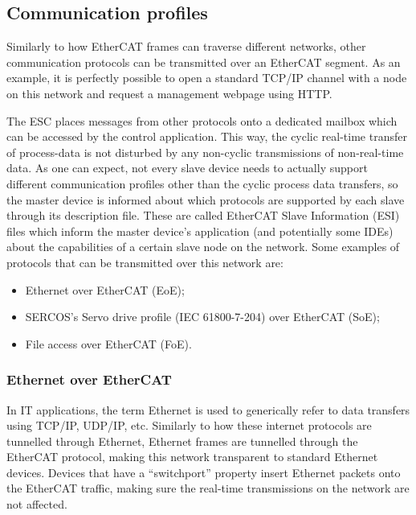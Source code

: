 \subsection{Communication profiles} \label{subsec:comm_profiles}

Similarly to how EtherCAT frames can traverse different networks, other communication protocols can be transmitted over an EtherCAT segment.
As an example, it is perfectly possible to open a standard TCP/IP channel with a node on this network and request a management webpage using HTTP.

The ESC places messages from other protocols onto a dedicated mailbox which can be accessed by the control application.
This way, the cyclic real-time transfer of process-data is not disturbed by any non-cyclic transmissions of non-real-time data.
As one can expect, not every slave device needs to actually support different communication profiles other than the cyclic process data transfers, so the master device is informed about which protocols are supported by each slave through its description file.
These are called EtherCAT Slave Information (ESI) files which inform the master device's application (and potentially some IDEs) about the capabilities of a certain slave node on the network.
Some examples of protocols that can be transmitted over this network are:

\begin{itemize}
	\item Ethernet over EtherCAT (EoE);
	\item SERCOS's \texttrademark{} Servo drive profile (IEC 61800-7-204) over EtherCAT (SoE);
	\item File access over EtherCAT (FoE).
\end{itemize}

\subsubsection{Ethernet over EtherCAT}

In IT applications, the term Ethernet is used to generically refer to data transfers using TCP/IP, UDP/IP, etc.
Similarly to how these internet protocols  are tunnelled through Ethernet, Ethernet frames are tunnelled through the EtherCAT protocol, making this network transparent to standard Ethernet devices.
Devices that have a ``switchport'' property insert Ethernet packets onto the EtherCAT traffic, making sure the real-time transmissions on the network are not affected.

